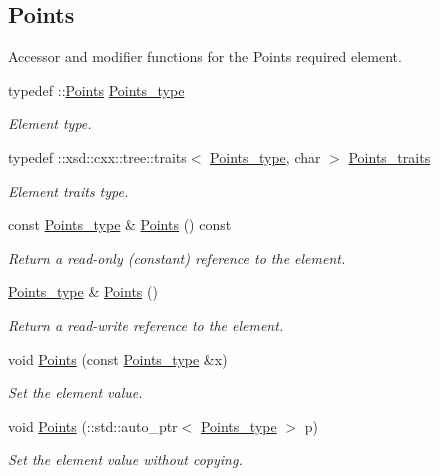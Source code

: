 \subsection*{Points}
\label{_amgrp75dd5f1160a3f02b6fae89c54361a1b3}%
Accessor and modifier functions for the Points required element. \begin{DoxyCompactItemize}
\item 
typedef \+::\hyperlink{classPoints}{Points} \hyperlink{classPieceUnstructuredGrid__t_a7747b159a3d1eee8d02a0eefaa235711}{Points\+\_\+type}
\begin{DoxyCompactList}\small\item\em Element type. \end{DoxyCompactList}\item 
typedef \+::xsd\+::cxx\+::tree\+::traits$<$ \hyperlink{classPieceUnstructuredGrid__t_a7747b159a3d1eee8d02a0eefaa235711}{Points\+\_\+type}, char $>$ \hyperlink{classPieceUnstructuredGrid__t_abdfd9c9f9eb5f43bd4cfcb2fad6d9f63}{Points\+\_\+traits}
\begin{DoxyCompactList}\small\item\em Element traits type. \end{DoxyCompactList}\item 
const \hyperlink{classPieceUnstructuredGrid__t_a7747b159a3d1eee8d02a0eefaa235711}{Points\+\_\+type} \& \hyperlink{classPieceUnstructuredGrid__t_a53dfd670cb335d13003dc229343a0fa1}{Points} () const 
\begin{DoxyCompactList}\small\item\em Return a read-\/only (constant) reference to the element. \end{DoxyCompactList}\item 
\hyperlink{classPieceUnstructuredGrid__t_a7747b159a3d1eee8d02a0eefaa235711}{Points\+\_\+type} \& \hyperlink{classPieceUnstructuredGrid__t_aa8e21b391979e8e2e22361e3b29e0276}{Points} ()
\begin{DoxyCompactList}\small\item\em Return a read-\/write reference to the element. \end{DoxyCompactList}\item 
void \hyperlink{classPieceUnstructuredGrid__t_ab653af7be8fbe0d3458bf8cd5cdf3668}{Points} (const \hyperlink{classPieceUnstructuredGrid__t_a7747b159a3d1eee8d02a0eefaa235711}{Points\+\_\+type} \&x)
\begin{DoxyCompactList}\small\item\em Set the element value. \end{DoxyCompactList}\item 
void \hyperlink{classPieceUnstructuredGrid__t_a3a44ef2850c664e89d79075a51497b17}{Points} (\+::std\+::auto\+\_\+ptr$<$ \hyperlink{classPieceUnstructuredGrid__t_a7747b159a3d1eee8d02a0eefaa235711}{Points\+\_\+type} $>$ p)
\begin{DoxyCompactList}\small\item\em Set the element value without copying. \end{DoxyCompactList}\end{DoxyCompactItemize}
